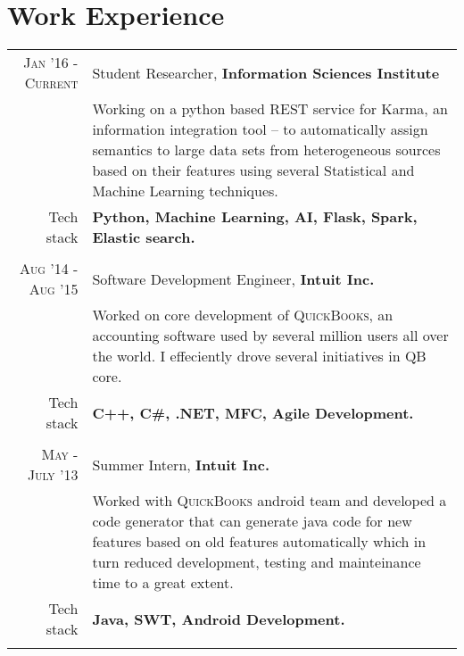 \documentclass[a4paper]{article} %
\begin{document}
\section{Work Experience}
\renewcommand{\arraystretch}{0.85}%
\begin{tabular}{r|p{12cm}}
\textsc{Jan '16 - Current} & Student Researcher, \textbf{Information Sciences Institute} \\
& \small{Working on a python based REST service for Karma, an information integration tool – to automatically assign semantics to large data sets from heterogeneous sources based on their features using several Statistical and Machine Learning techniques.}\\
\small{Tech stack} &\footnotesize{\textbf{Python, Machine Learning, AI, Flask, Spark, Elastic search.}} \\
\multicolumn{2}{c}{} \\


\textsc{Aug '14 - Aug '15} & Software Development Engineer, \textbf{Intuit Inc.} \\
& \small{Worked on core development of \textsc{QuickBooks}, an accounting software used by several million users all over the world. I effeciently drove several initiatives in QB core.}\\
\small{Tech stack} &\footnotesize{\textbf{C++, C\#, .NET, MFC, Agile Development.}} \\
\multicolumn{2}{c}{} \\

\textsc{May - July '13} & Summer Intern, \textbf{Intuit Inc.}\\ 
& \small{Worked with \textsc{QuickBooks} android  team and developed a code generator that can generate java code for new features based on old features automatically which in turn reduced development, testing and mainteinance time to a great extent.}\\
\small{Tech stack} &\footnotesize{\textbf{Java, SWT, Android Development.}} \\
\multicolumn{2}{c}{} \\




\end{tabular}
\end{document}
